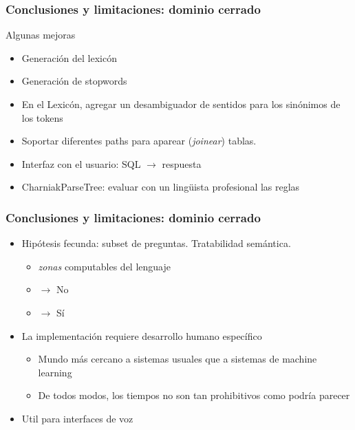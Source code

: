 \begin{frame}[<+->]
\frametitle{Conclusiones y limitaciones: dominio cerrado}
Algunas mejoras
\begin{itemize}
\item Generación del lexicón
\item Generación de stopwords
\item En el Lexicón, agregar un desambiguador de sentidos para los sinónimos de los tokens
\item Soportar diferentes paths para aparear (\textit{joinear}) tablas.
\item Interfaz con el usuario: SQL $\rightarrow$ respuesta
\item CharniakParseTree: evaluar con un lingüista profesional las reglas

\end{itemize}
\end{frame}


\begin{frame}[<+->]
\frametitle{Conclusiones y limitaciones: dominio cerrado}

\begin{itemize}
  \item Hipótesis fecunda: subset de preguntas. Tratabilidad semántica.
  \begin{itemize}
    \item \textit{zonas} computables del lenguaje
    \item {} $\rightarrow$ {\color{red}No}
    \item {} $\rightarrow$ {\color{green}Sí}
  \end{itemize}
  \item La implementación requiere desarrollo humano específico
  \begin{itemize}
    \item Mundo más cercano a sistemas usuales que a sistemas de machine learning
    \item De todos modos, los tiempos no son tan prohibitivos como podría parecer
  \end{itemize}
  \item Util para interfaces de voz
  \end{itemize}

\end{frame}





